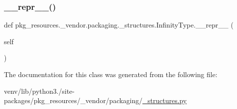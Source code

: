 \subsubsection{\texorpdfstring{\+\_\+\+\_\+repr\+\_\+\+\_\+()}{\_\_repr\_\_()}}
{\footnotesize\ttfamily def pkg\+\_\+resources.\+\_\+vendor.\+packaging.\+\_\+structures.\+Infinity\+Type.\+\_\+\+\_\+repr\+\_\+\+\_\+ (\begin{DoxyParamCaption}\item[{}]{self }\end{DoxyParamCaption})}



The documentation for this class was generated from the following file\+:\begin{DoxyCompactItemize}
\item 
venv/lib/python3./site-\/packages/pkg\+\_\+resources/\+\_\+vendor/packaging/\hyperlink{pkg__resources_2__vendor_2packaging_2__structures_8py}{\+\_\+structures.\+py}\end{DoxyCompactItemize}
